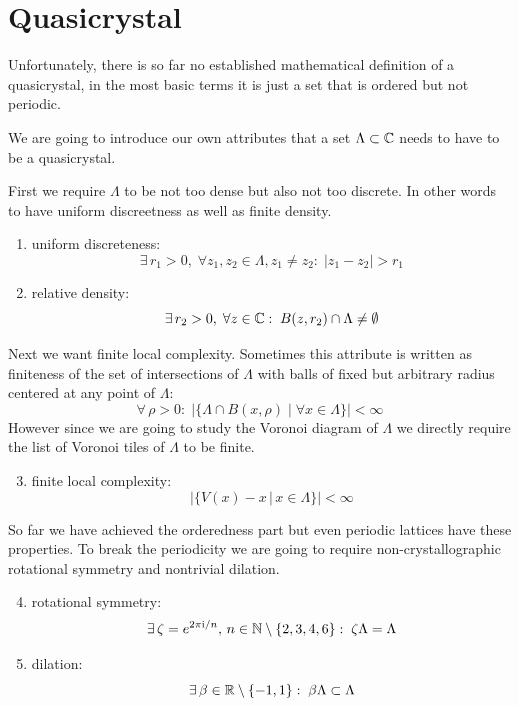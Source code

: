\documentclass[text.tex]{subfiles}
\begin{document}
\section{Quasicrystal}\label{sec_quasicrystalEaseIn}%
Unfortunately, there is so far no established mathematical definition of a quasicrystal, in the most basic terms it is just a set that is ordered but not periodic. 

We are going to introduce our own attributes that a set $\Lambda\subset\mathbb{C}$ needs to have to be a quasicrystal. 

First we require $\Lambda$ to be not too dense but also not too discrete. In other words to have uniform discreetness as well as finite density. 

\begin{enumerate}
\item uniform discreteness: $$\exists\,r_1>0,\; \forall z_1,z_2\in\Lambda, z_1\neq z_2:\; |z_1-z_2|>r_1$$
\item relative density: $$\exists\,r_2>0,\; \forall z\in\mathbb{C}:\; B(z,r_2)\cap\Lambda \neq \emptyset$$
\end{enumerate}

Next we want finite local complexity. Sometimes this attribute is written as finiteness of the set of intersections of $\Lambda$ with balls of fixed but arbitrary radius centered at any point of $\Lambda$:
$$\forall\,\rho>0:\;\big|\{\Lambda\cap B(x,\rho)\;|\;\forall x\in\Lambda\}\big| < \infty$$
However since we are going to study the Voronoi diagram of $\Lambda$ we directly require the list of Voronoi tiles of $\Lambda$ to be finite. 

\begin{enumerate}
\setcounter{enumi}{2}
\item finite local complexity: $$\big|\{V(x)-x\,|\, x\in \Lambda\}\big|<\infty$$
\end{enumerate}

So far we have achieved the orderedness part but even periodic lattices have these properties. To break the periodicity we are going to require non-crystallographic rotational symmetry and nontrivial dilation.  

\begin{enumerate}
\setcounter{enumi}{3}
\item rotational symmetry: $$\exists\,\zeta = e^{2\pi \mathrm{i}/n},\,n\in\mathbb{N}\setminus\{2,3,4,6\}:\; \zeta\Lambda = \Lambda$$
\item dilation: $$\exists\,\beta\in\mathbb{R}\setminus\{-1,1\}:\; \beta\Lambda\subset \Lambda$$
\end{enumerate}
\end{document}
